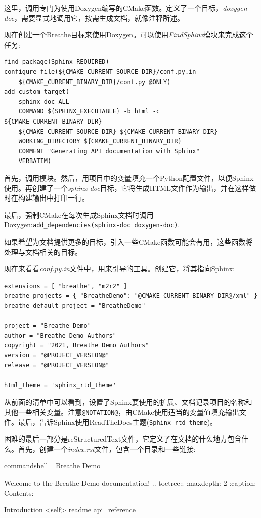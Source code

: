 这里，调用专门为使用Doxygen编写的CMake函数。定义了一个目标，\textit{doxygen-doc}，需要显式地调用它，按需生成文档，就像注释所述。

现在创建一个Breathe目标来使用Doxygen。可以使用\textit{FindSphinx}模块来完成这个任务:

\begin{lstlisting}[style=styleCMake]
find_package(Sphinx REQUIRED)
configure_file(${CMAKE_CURRENT_SOURCE_DIR}/conf.py.in
	${CMAKE_CURRENT_BINARY_DIR}/conf.py @ONLY)
add_custom_target(
	sphinx-doc ALL
	COMMAND ${SPHINX_EXECUTABLE} -b html -c ${CMAKE_CURRENT_BINARY_DIR}
	${CMAKE_CURRENT_SOURCE_DIR} ${CMAKE_CURRENT_BINARY_DIR}
	WORKING_DIRECTORY ${CMAKE_CURRENT_BINARY_DIR}
	COMMENT "Generating API documentation with Sphinx"
	VERBATIM)
\end{lstlisting}

首先，调用模块。然后，用项目中的变量填充一个Python配置文件，以便Sphinx使用。再创建了一个\textit{sphinx-doc}目标，它将生成HTML文件作为输出，并在这样做时在构建输出中打印一行。

最后，强制CMake在每次生成Sphinx文档时调用Doxygen:\texttt{add\_dependencies(sphinx-doc doxygen-doc)}.

如果希望为文档提供更多的目标，引入一些CMake函数可能会有用，这些函数将处理与文档相关的目标。

现在来看看\textit{conf.py.in}文件中，用来引导的工具。创建它，将其指向Sphinx:

\begin{lstlisting}[style=stylePython]
extensions = [ "breathe", "m2r2" ]
breathe_projects = { "BreatheDemo": "@CMAKE_CURRENT_BINARY_DIR@/xml" }
breathe_default_project = "BreatheDemo"

project = "Breathe Demo"
author = "Breathe Demo Authors"
copyright = "2021, Breathe Demo Authors"
version = "@PROJECT_VERSION@"
release = "@PROJECT_VERSION@"

html_theme = 'sphinx_rtd_theme'
\end{lstlisting}

从前面的清单中可以看到，设置了Sphinx要使用的扩展、文档记录项目的名称和其他一些相关变量。注意\texttt{@NOTATION@}，由CMake使用适当的变量值填充输出文件。最后，告诉Sphinx使用ReadTheDocs主题(\texttt{Sphinx\_rtd\_theme})。

困难的最后一部分是reStructuredText文件，它定义了在文档的什么地方包含什么。首先，创建一个\textit{index.rst}文件，包含一个目录和一些链接:

\begin{tcblisting}{commandshell={}}
Breathe Demo
============

Welcome to the Breathe Demo documentation!
.. toctree::
    :maxdepth: 2
    :caption: Contents:
   
Introduction <self>
    readme
    api_reference
\end{tcblisting}

